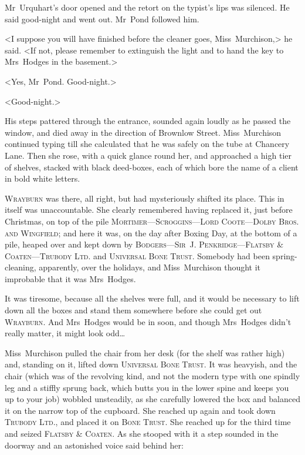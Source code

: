 Mr~Urquhart's door opened and the retort on the typist's lips was silenced. He said good-night and went out. Mr~Pond followed him.

<I suppose you will have finished before the cleaner goes, Miss~Murchison,> he said. <If not, please remember to extinguish the light and to hand the key to Mrs~Hodges in the basement.>

<Yes, Mr~Pond. Good-night.>

<Good-night.>

His steps pattered through the entrance, sounded again loudly as he passed the window, and died away in the direction of Brownlow Street. Miss~Murchison continued typing till she calculated that he was safely on the tube at Chancery Lane. Then she rose, with a quick glance round her, and approached a high tier of shelves, stacked with black deed-boxes, each of which bore the name of a client in bold white letters.

\textsc{Wrayburn} was there, all right, but had mysteriously shifted its place. This in itself was unaccountable. She clearly remembered having replaced it, just before Christmas, on top of the pile \textsc{Mortimer—Scroggins—Lord Coote—Dolby Bros\@. and Wingfield;} and here it was, on the day after Boxing Day, at the bottom of a pile, heaped over and kept down by \textsc{Bodgers—Sir~J. Penkridge—Flatsby \& Coaten—Trubody Ltd.} and \textsc{Universal Bone Trust}. Somebody had been spring-cleaning, apparently, over the holidays, and Miss~Murchison thought it improbable that it was Mrs~Hodges.

It was tiresome, because all the shelves were full, and it would be necessary to lift down all the boxes and stand them somewhere before she could get out \textsc{Wrayburn}. And Mrs~Hodges would be in soon, and though Mrs~Hodges didn't really matter, it might look odd\dots

Miss~Murchison pulled the chair from her desk (for the shelf was rather high) and, standing on it, lifted down \textsc{Universal Bone Trust}. It was heavyish, and the chair (which was of the revolving kind, and not the modern type with one spindly leg and a stiffly sprung back, which butts you in the lower spine and keeps you up to your job) wobbled unsteadily, as she carefully lowered the box and balanced it on the narrow top of the cupboard. She reached up again and took down \textsc{Trubody Ltd.}, and placed it on \textsc{Bone Trust}. She reached up for the third time and seized \textsc{Flatsby \& Coaten}. As she stooped with it a step sounded in the doorway and an astonished voice said behind her:

